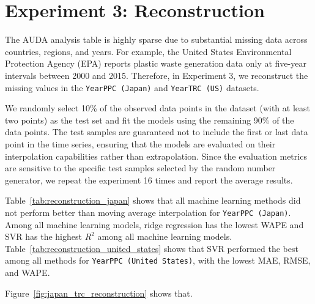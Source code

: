 \section{Experiment 3: Reconstruction}

The AUDA analysis table is highly sparse due to substantial missing data across countries, regions, and years. For example, the United States Environmental Protection Agency (EPA) reports plastic waste generation data only at five-year intervals between 2000 and 2015. Therefore, in Experiment 3, we reconstruct the missing values in the \texttt{YearPPC (Japan)} and \texttt{YearTRC (US)} datasets.

We randomly select 10\% of the observed data points in the dataset (with at least two points) as the test set and fit the models using the remaining 90\% of the data points. The test samples are guaranteed not to include the first or last data point in the time series, ensuring that the models are evaluated on their interpolation capabilities rather than extrapolation. Since the evaluation metrics are sensitive to the specific test samples selected by the random number generator, we repeat the experiment 16 times and report the average results.




Table~\ref{tab:reconstruction_japan} shows that all machine learning methods did not perform better than moving average interpolation for \texttt{YearPPC (Japan)}. Among all machine learning models, ridge regression has the lowest WAPE and SVR has the highest \(R^2\) among all machine learning models. Table~\ref{tab:reconstruction_united_states} shows that SVR performed the best among all methods for \texttt{YearPPC (United States)}, with the lowest MAE, RMSE, and WAPE.



Figure~\ref{fig:japan_trc_reconstruction} shows that.
